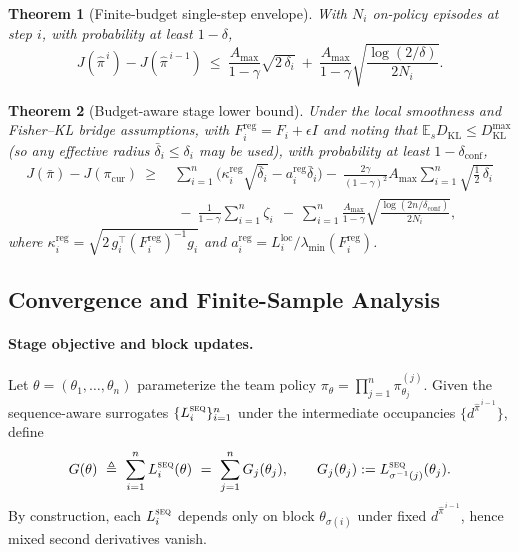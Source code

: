 \documentclass[sigconf]{aamas}
\newtheorem{theorem}{Theorem}[section]
\newcommand{\E}{\mathbb{E}}
\newcommand{\KL}{D_{\mathrm{KL}}}
\begin{document}
\begin{theorem}[Finite-budget single-step envelope]
\label{thm:budget-upper}
With $N_i$ on-policy episodes at step $i$, with probability at least $1-\delta$,
\[
J(\hat\pi^{\,i})-J(\hat\pi^{\,i-1})
\ \le\ \frac{A_{\max}}{1-\gamma}\sqrt{2\,\delta_i}
\ +\ \frac{A_{\max}}{1-\gamma}\sqrt{\frac{\log(2/\delta)}{2N_i}}.
\]
\end{theorem}

\begin{theorem}[Budget-aware stage lower bound]
\label{thm:info-lower}
Under the local smoothness and Fisher–KL bridge assumptions, with $F_i^{\mathrm{reg}} = F_i + \epsilon I$ and noting that $\E_s\KL\le \KL^{\max}$ (so any effective radius $\bar\delta_i\le\delta_i$ may be used), with probability at least $1-\delta_{\mathrm{conf}}$,
\[
\begin{aligned}
J(\bar\pi)-J(\pi_{\mathrm{cur}})
\ \ge\ 
&\sum_{i=1}^{n}\big(\kappa_i^{\mathrm{reg}}\sqrt{\bar\delta_i}-a_i^{\mathrm{reg}}\bar\delta_i\big)
-\ \frac{2\gamma}{(1-\gamma)^2}A_{\max}\sum_{i=1}^{n}\sqrt{\tfrac12\,\delta_i} \\
&\ -\ \frac{1}{1-\gamma}\sum_{i=1}^{n}\zeta_i
\ \ -\ \sum_{i=1}^{n}\frac{A_{\max}}{1-\gamma}\sqrt{\frac{\log(2n/\delta_{\mathrm{conf}})}{2N_i}},
\end{aligned}
\]
where $\kappa_i^{\mathrm{reg}} = \sqrt{2\,g_i^\top (F_i^{\mathrm{reg}})^{-1}g_i}$ and $a_i^{\mathrm{reg}} = L_i^{\mathrm{loc}}/\lambda_{\min}(F_i^{\mathrm{reg}})$.
\end{theorem}

\subsection{Convergence and Finite-Sample Analysis}

\paragraph{Stage objective and block updates.}
Let $\theta=(\theta_1,\ldots,\theta_n)$ parameterize the team policy $\pi_\theta=\prod_{j=1}^n\pi^{(j)}_{\theta_j}$.
Given the sequence-aware surrogates $\{L_i^{\textsc{seq}}\}_{i=1}^n$ under the intermediate occupancies $\{d^{\hat\pi^{\,i-1}}\}$, define
\[
G(\theta)\ \triangleq\ \sum_{i=1}^{n}L_i^{\textsc{seq}}(\theta)\ =\ \sum_{j=1}^{n}G_j(\theta_j),
\qquad
G_j(\theta_j):=L^{\textsc{seq}}_{\sigma^{-1}(j)}(\theta_j).
\]
By construction, each $L_i^{\textsc{seq}}$ depends only on block $\theta_{\sigma(i)}$ under fixed $d^{\hat\pi^{\,i-1}}$, hence mixed second derivatives vanish.
\end{document}
